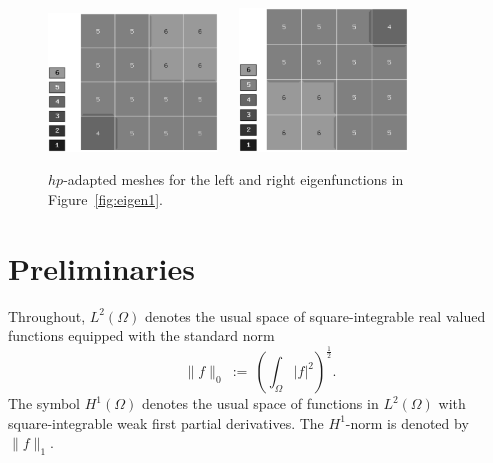 \documentclass[preprint,12pt]{elsarticle}
\begin{document}
\begin{figure}[!ht]
\begin{center}
\includegraphics[width=0.4\textwidth]{mesh1.eps}\ \ \ 
\includegraphics[width=0.4\textwidth]{mesh2.eps}\\
\end{center}
\caption{$hp$-adapted meshes for the left and right eigenfunctions in Figure~\ref{fig:eigen1}. }
\label{fig:mesh1}
\end{figure}




\section{Preliminaries}\label{sec:preli}

Throughout, $L^2(\Omega)$
denotes the usual space of square-integrable real valued functions
equipped with the standard norm
\begin{equation}\label{eq:l2}
\|f\|_{0}\ := \ \left(\int_\Omega  |f|^2\right)^{\frac{1}{2}} .
\end{equation}
The symbol $H^1(\Omega)$ denotes the usual space of functions in $L^2(\Omega)$
with square-integrable weak first partial derivatives. The $H^1$-norm is 
denoted by $\|f\|_1$.
\end{document}
